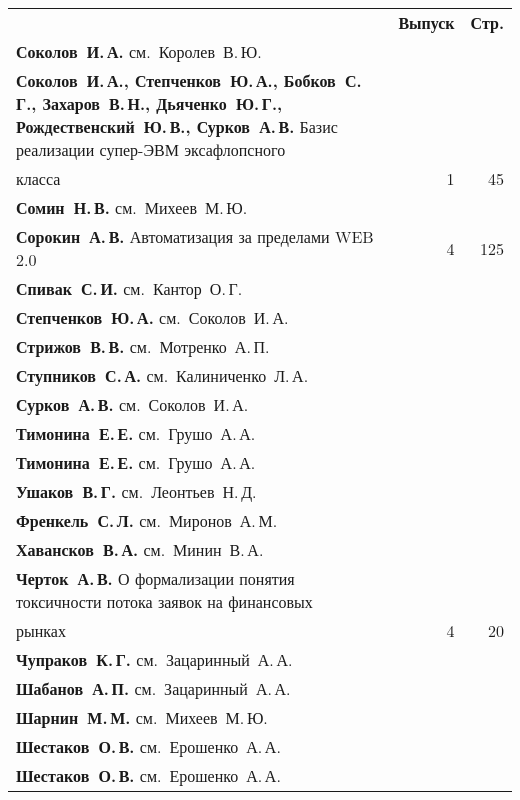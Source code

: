 {\tabcolsep=3pt
\begin{tabular}{p{388pt}rr}
&\textbf{Выпуск} & \textbf{Стр.}\\[3pt]
\textbf{Соколов~И.\,А.} см.\ Королев~В.\,Ю.&&\\
\hangindent=23pt\noindent\textbf{Соколов~И.\,А., Степченков~Ю.\,А., Бобков~С.\,Г.,
Захаров~В.\,Н., Дьяченко~Ю.\,Г., Рож\-де\-ст\-вен\-ский~Ю.\,В., Сурков~А.\,В.}
Базис реализации супер-ЭВМ эксафлопсного\linebreak
\vspace*{-12pt}\\
\hspace*{23pt}класса\dotfill&1&45\\
\textbf{Сомин~Н.\,В.} см.\ Михеев~М.\,Ю.&&\\
\textbf{Сорокин~А.\,В.} Автоматизация за пределами WEB 2.0\dotfill&4&125\\
\textbf{Спивак~С.\,И.} см.\ Кантор~О.\,Г.&&\\
\textbf{Степченков~Ю.\,А.} см.\ Соколов~И.\,А.&&\\
\textbf{Стрижов~В.\,В.} см.\ Мотренко~А.\,П.&&\\
\textbf{Ступников~С.\,А.} см.\ Калиниченко~Л.\,А.&&\\
\textbf{Сурков~А.\,В.} см.\ Соколов~И.\,А.&&\\
\textbf{Тимонина~Е.\,Е.} см.\ Грушо~А.\,А.&&\\
\textbf{Тимонина~Е.\,Е.} см.\ Грушо~А.\,А.&&\\
\textbf{Ушаков~В.\,Г.} см.\ Леонтьев~Н.\,Д.&&\\
\textbf{Френкель~С.\,Л.} см.\ Миронов~А.\,М.&&\\
\textbf{Хавансков~В.\,А.} см.\ Минин~В.\,А.&&\\
\textbf{Черток~А.\,В.} О формализации понятия токсичности потока заявок на
финансовых\linebreak
\vspace*{-12pt}\\
\hspace*{23pt}рынках\dotfill&4&20\\
\textbf{Чупраков~К.\,Г.} см.\ Зацаринный~А.\,А.&&\\
\textbf{Шабанов~А.\,П.} см.\ Зацаринный~А.\,А.&&\\
\textbf{Шарнин~М.\,М.} см.\ Михеев~М.\,Ю.&&\\
\textbf{Шестаков~О.\,В.} см.\ Ерошенко~А.\,А.&&\\
\textbf{Шестаков~О.\,В.} см.\ Ерошенко~А.\,А.&&\\

\end{tabular}}
